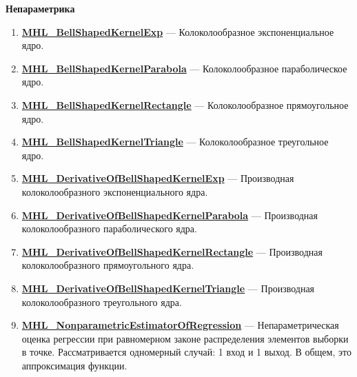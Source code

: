 \documentclass[a4paper,12pt]{article}
\begin{document}
\textbf{Непараметрика}
\begin{enumerate}

\item \textbf{\hyperref[MHL_BellShapedKernelExp]{MHL\_BellShapedKernelExp}} --- Колоколообразное экспоненциальное ядро.

\item \textbf{\hyperref[MHL_BellShapedKernelParabola]{MHL\_BellShapedKernelParabola}} --- Колоколообразное параболическое ядро.

\item \textbf{\hyperref[MHL_BellShapedKernelRectangle]{MHL\_BellShapedKernelRectangle}} --- Колоколообразное прямоугольное ядро.

\item \textbf{\hyperref[MHL_BellShapedKernelTriangle]{MHL\_BellShapedKernelTriangle}} --- Колоколообразное треугольное ядро.

\item \textbf{\hyperref[MHL_DerivativeOfBellShapedKernelExp]{MHL\_DerivativeOfBellShapedKernelExp}} --- Производная колоколообразного экспоненциального ядра.

\item \textbf{\hyperref[MHL_DerivativeOfBellShapedKernelParabola]{MHL\_DerivativeOfBellShapedKernelParabola}} --- Производная колоколообразного параболического ядра.

\item \textbf{\hyperref[MHL_DerivativeOfBellShapedKernelRectangle]{MHL\_DerivativeOfBellShapedKernelRectangle}} --- Производная колоколообразного прямоугольного ядра.

\item \textbf{\hyperref[MHL_DerivativeOfBellShapedKernelTriangle]{MHL\_DerivativeOfBellShapedKernelTriangle}} --- Производная колоколообразного треугольного ядра.

\item \textbf{\hyperref[MHL_NonparametricEstimatorOfRegression]{MHL\_NonparametricEstimatorOfRegression}} --- Непараметрическая оценка регрессии при равномерном законе распределения элементов выборки в точке. Рассматривается одномерный случай: 1 вход и 1 выход. В общем, это аппроксимация функции.

\end{enumerate}
\end{document}
